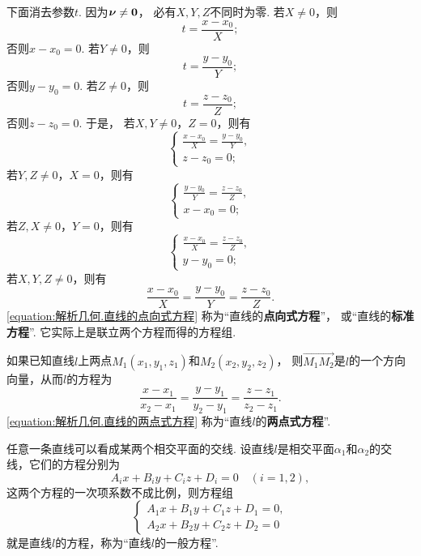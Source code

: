 下面消去参数\(t\).
因为\(\boldsymbol{\nu}\neq\boldsymbol{0}\)，
必有\(X,Y,Z\)不同时为零.
若\(X\neq0\)，则\[
	t = \frac{x - x_0}{X};
\]
否则\(x - x_0 = 0\).
若\(Y\neq0\)，则\[
	t = \frac{y - y_0}{Y};
\]
否则\(y - y_0 = 0\).
若\(Z\neq0\)，则\[
	t = \frac{z - z_0}{Z};
\]
否则\(z - z_0 = 0\).
于是，
若\(X,Y\neq0\)，\(Z=0\)，则有
\begin{equation}
	\left\{ \begin{array}{l}
		\frac{x - x_0}{X}
		= \frac{y - y_0}{Y}, \\
		z - z_0 = 0;
	\end{array} \right.
\end{equation}
若\(Y,Z\neq0\)，\(X=0\)，则有
\begin{equation}
	\left\{ \begin{array}{l}
		\frac{y - y_0}{Y}
		= \frac{z - z_0}{Z}, \\
		x - x_0 = 0;
	\end{array} \right.
\end{equation}
若\(Z,X\neq0\)，\(Y=0\)，则有
\begin{equation}
	\left\{ \begin{array}{l}
		\frac{x - x_0}{X}
		= \frac{z - z_0}{Z}, \\
		y - y_0 = 0;
	\end{array} \right.
\end{equation}
若\(X,Y,Z\neq0\)，则有
\begin{equation}\label{equation:解析几何.直线的点向式方程}
	\frac{x - x_0}{X}
	= \frac{y - y_0}{Y}
	= \frac{z - z_0}{Z}.
\end{equation}
\cref{equation:解析几何.直线的点向式方程}
称为“直线的\textbf{点向式方程}”，
或“直线的\textbf{标准方程}”.
它实际上是联立两个方程而得的方程组.

如果已知直线\(l\)上两点\(M_1(x_1,y_1,z_1)\)和\(M_2(x_2,y_2,z_2)\)，
则\(\vec{M_1 M_2}\)是\(l\)的一个方向向量，从而\(l\)的方程为
\begin{equation}\label{equation:解析几何.直线的两点式方程}
	\frac{x - x_1}{x_2 - x_1}
	= \frac{y - y_1}{y_2 - y_1}
	= \frac{z - z_1}{z_2 - z_1}.
\end{equation}
\cref{equation:解析几何.直线的两点式方程}
称为“直线\(l\)的\textbf{两点式方程}”.

任意一条直线可以看成某两个相交平面的交线.
设直线\(l\)是相交平面\(\alpha_1\)和\(\alpha_2\)的交线，它们的方程分别为\[
	A_i x + B_i y + C_i z + D_i = 0
	\quad(i=1,2),
\]
这两个方程的一次项系数不成比例，则方程组
\begin{equation}
	\left\{ \begin{array}{l}
		A_1 x + B_1 y + C_1 z + D_1 = 0, \\
		A_2 x + B_2 y + C_2 z + D_2 = 0
	\end{array} \right.
\end{equation}
就是直线\(l\)的方程，称为“直线\(l\)的一般方程”.

